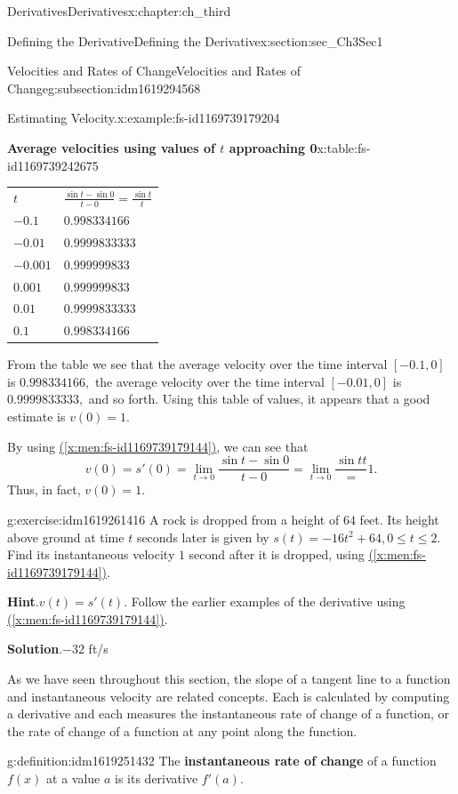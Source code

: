 \documentclass[oneside,10pt,]{book}
\newcommand{\blocktitlefont}{\relax}
\newcommand{\tabularfont}{\relax}
\newcommand{\xreffont}{\relax}
\newcommand{\terminology}[1]{\textbf{#1}}
\numberwithin{equation}{section}
\begin{document}
\begin{chapterptx}{Derivatives}{}{Derivatives}{}{}{x:chapter:ch_third}
\begin{sectionptx}{Defining the Derivative}{}{Defining the Derivative}{}{}{x:section:sec_Ch3Sec1}
\begin{subsectionptx}{Velocities and Rates of Change}{}{Velocities and Rates of Change}{}{}{g:subsection:idm1619294568}
\begin{example}{Estimating Velocity.}{x:example:fs-id1169739179204}
\begin{tableptx}{\textbf{Average velocities using values of \(t\) approaching 0}}{x:table:fs-id1169739242675}{}
\centering%
{\tabularfont%
\begin{tabular}{ll}
\textbf{\(t\)}&\textbf{\(\frac{\sin t-\sin 0}{t-0}=\frac{\sin t}{t}\)}\tabularnewline[0pt]
\(-0.1\)&\(0.998334166\)\tabularnewline[0pt]
\(-0.01\)&\(0.9999833333\)\tabularnewline[0pt]
\(-0.001\)&\(0.999999833\)\tabularnewline[0pt]
\(0.001\)&\(0.999999833\)\tabularnewline[0pt]
\(0.01\)&\(0.9999833333\)\tabularnewline[0pt]
\(0.1\)&\(0.998334166\)
\end{tabular}
}%
\end{tableptx}%
From the table we see that the average velocity over the time interval \([-0.1,0]\) is \(0.998334166,\) the average velocity over the time interval \([-0.01,0]\) is \(0.9999833333,\) and so forth. Using this table of values, it appears that a good estimate is \(v(0)=1.\)%
\par
By using \hyperref[x:men:fs-id1169739179144]{({\xreffont\ref{x:men:fs-id1169739179144}})}, we can see that%
%
\begin{equation*}
v(0)=s'(0)=\lim_{t\to 0}\frac{\sin t-\sin 0}{t-0}=\lim_{t\to 0}\frac{\sin tt}=1.
\end{equation*}
Thus, in fact, \(v(0)=1.\)%
\end{example}
\begin{inlineexercise}{}{g:exercise:idm1619261416}%
A rock is dropped from a height of \(64\) feet. Its height above ground at time \(t\) seconds later is given by \(s(t)=-16t^2+64,0 \leq  t \leq  2.\) Find its instantaneous velocity \(1\) second after it is dropped, using \hyperref[x:men:fs-id1169739179144]{({\xreffont\ref{x:men:fs-id1169739179144}})}.%
\par\smallskip%
\noindent\textbf{\blocktitlefont Hint}.\hypertarget{g:hint:idm1619257064}{}\quad{}\(v(t)=s'(t).\) Follow the earlier examples of the derivative using \hyperref[x:men:fs-id1169739179144]{({\xreffont\ref{x:men:fs-id1169739179144}})}.%
\par\smallskip%
\noindent\textbf{\blocktitlefont Solution}.\hypertarget{g:solution:idm1619255912}{}\quad{}\(-32\) ft\slash{}s%
\end{inlineexercise}%
As we have seen throughout this section, the slope of a tangent line to a function and instantaneous velocity are related concepts. Each is calculated by computing a derivative and each measures the instantaneous rate of change of a function, or the rate of change of a function at any point along the function.%
\begin{definition}{}{g:definition:idm1619251432}%
The \terminology{instantaneous rate of change} of a function \(f(x)\) at a value \(a\) is its derivative \(f'(a).\)%

\end{definition}
\end{subsectionptx}
\end{sectionptx}
\end{chapterptx}
\end{document}
